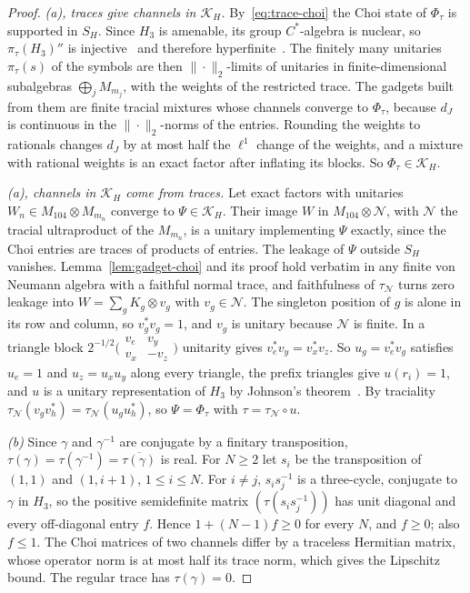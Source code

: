 \documentclass[11pt,a4paper]{article}
\theoremstyle{plain}
\theoremstyle{definition}
\theoremstyle{remark}
\newcommand{\dJ}{d_J}
\begin{document}
\begin{proof}
\emph{(a), traces give channels in $\mathcal K_H$.} By~\eqref{eq:trace-choi} the Choi state of $\Phi_\tau$ is supported in $S_H$. Since $H_3$ is
amenable, its group $C^*$-algebra is nuclear, so $\pi_\tau(H_3)''$ is injective~\cite{BrownOzawa2008} and therefore hyperfinite~\cite{Connes1976}.
The finitely many unitaries $\pi_\tau(s)$ of the symbols are then $\|\cdot\|_2$-limits of unitaries in finite-dimensional subalgebras
$\bigoplus_jM_{m_j}$, with the weights of the restricted trace. The gadgets built from them are finite tracial mixtures whose channels converge to
$\Phi_\tau$, because $\dJ$ is continuous in the $\|\cdot\|_2$-norms of the entries. Rounding the weights to rationals changes $\dJ$ by at most half the
$\ell^1$ change of the weights, and a mixture with rational weights is an exact factor after inflating its blocks. So $\Phi_\tau\in\mathcal K_H$.

\emph{(a), channels in $\mathcal K_H$ come from traces.} Let exact factors with unitaries $W_n\in M_{104}\otimes M_{m_n}$ converge to
$\Psi\in\mathcal K_H$. Their image $W$ in $M_{104}\otimes\mathcal N$, with $\mathcal N$ the tracial ultraproduct of the $M_{m_n}$, is a unitary implementing
$\Psi$ exactly, since the Choi entries are traces of products of entries. The leakage of $\Psi$ outside $S_H$ vanishes.
Lemma~\ref{lem:gadget-choi} and its proof hold verbatim in any finite von Neumann algebra with a faithful normal trace, and faithfulness of
$\tau_{\mathcal N}$ turns zero leakage into $W=\sum_gK_g\otimes v_g$ with $v_g\in\mathcal N$. The singleton position of $g$ is alone in its row and
column, so $v_g^*v_g=1$, and $v_g$ is unitary because $\mathcal N$ is finite. In a triangle block
$2^{-1/2}\bigl(\begin{smallmatrix}v_e&v_y\\v_x&-v_z\end{smallmatrix}\bigr)$ unitarity gives $v_e^*v_y=v_x^*v_z$. So $u_g=v_e^*v_g$ satisfies $u_e=1$
and $u_z=u_xu_y$ along every triangle, the prefix triangles give $u(r_i)=1$, and $u$ is a unitary representation of $H_3$ by Johnson's theorem~\cite{Johnson1999}. By
traciality $\tau_{\mathcal N}(v_gv_h^*)=\tau_{\mathcal N}(u_gu_h^*)$, so $\Psi=\Phi_\tau$ with $\tau=\tau_{\mathcal N}\circ u$.

\emph{(b)} Since $\gamma$ and $\gamma^{-1}$ are conjugate by a finitary transposition, $\tau(\gamma)=\tau(\gamma^{-1})=\overline{\tau(\gamma)}$ is real. For
$N\ge2$ let $s_i$ be the transposition of $(1,1)$ and $(1,i+1)$, $1\le i\le N$. For $i\ne j$, $s_is_j^{-1}$ is a three-cycle, conjugate to $\gamma$ in
$H_3$, so the positive semidefinite matrix $(\tau(s_is_j^{-1}))$ has unit diagonal and every off-diagonal entry $f$. Hence $1+(N-1)f\ge0$ for every
$N$, and $f\ge0$; also $f\le1$. The Choi matrices of two channels differ by a traceless Hermitian matrix, whose operator norm is at most half its
trace norm, which gives the Lipschitz bound. The regular trace has $\tau(\gamma)=0$.


\end{proof}
\end{document}
